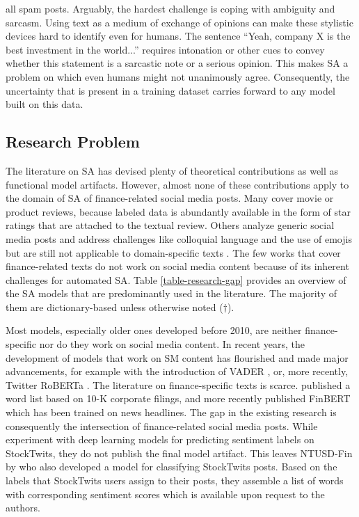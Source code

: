 all spam posts. Arguably, the hardest challenge is coping with ambiguity and sarcasm. Using text as a medium of exchange of opinions can make these stylistic devices hard to identify even for humans. The sentence ``Yeah, company X is the best investment in the world...'' requires intonation or other cues to convey whether this statement is a sarcastic note or a serious opinion. This makes SA a problem on which even humans might not unanimously agree. Consequently, the uncertainty that is present in a training dataset carries forward to any model built on this data.





\subsection{Research Problem}
\label{section-research-gap}
The literature on SA has devised plenty of theoretical contributions as well as functional model artifacts. However, almost none of these contributions apply to the domain of SA of finance-related social media posts. Many cover movie or product reviews, because labeled data is abundantly available in the form of star ratings that are attached to the textual review. Others analyze generic social media posts and address challenges like colloquial language and the use of emojis but are still not applicable to domain-specific texts . The few works that cover finance-related texts \cite{loughranMcD2011, araci2019finbert}  do not work on social media content because of its inherent challenges for automated SA. Table \ref{table-research-gap} provides an overview of the SA models that are predominantly used in the literature. The majority of them are dictionary-based unless otherwise noted ($\dagger$).



Most models, especially older ones developed before 2010, are neither finance-specific nor do they work on social media content. In recent years, the development of models that work on SM content has flourished and made major advancements, for example with the introduction of VADER , or, more recently, Twitter RoBERTa . The literature on finance-specific texts is scarce.  published a word list based on 10-K corporate filings, and more recently  published FinBERT which has been trained on news headlines. The gap in the existing research is consequently the intersection of finance-related social media posts. While  experiment with deep learning models for predicting sentiment labels on StockTwits, they do not publish the final model artifact. This leaves NTUSD-Fin by  who also developed a model for classifying StockTwits posts. Based on the labels that StockTwits users assign to their posts, they assemble a list of words with corresponding sentiment scores which is available upon request to the authors.

